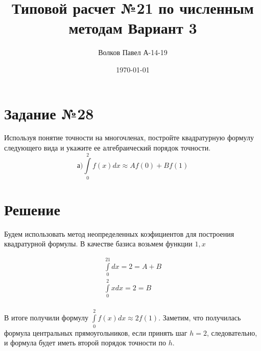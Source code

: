 \documentclass[a4paper,12pt]{report} %
\author{Волков Павел А-14-19}
\title{Типовой расчет №21 по численным методам Вариант 3}
\date{\today}
\begin{document}

\section*{Задание №28}

Используя понятие точности на многочленах, постройте квадратурную формулу следующего вида и укажите ее алгебраический порядок точности.
\[
	а) \int\limits_0^2f(x)dx \approx Af(0) + Bf(1)
\]

\section*{Решение}
Будем использовать метод неопределенных коэфициентов для построения квадратурной формулы. В качестве базиса возьмем функции $1, x$

\begin{gather*}
	 \int\limits_0^21dx = 2 = A + B \\
	 \int\limits_0^2xdx = 2 = B \\
\end{gather*}

В итоге получили формулу $\int\limits_0^2f(x)dx \approx 2f(1)$. Заметим, что получилась формула центральных прямоугольников, если принять  шаг $h=2$, следовательно, и формула будет иметь второй порядок точности по $h$.
\end{document}

